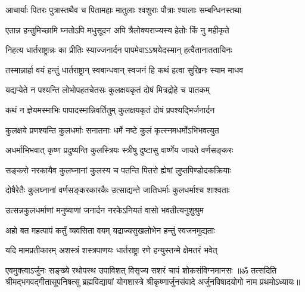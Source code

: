 \twolineshloka
{आचार्याः पितरः पुत्रास्तथैव च पितामहाः}
{मातुलाः श्वशुराः पौत्राः श्यालाः सम्बन्धिनस्तथा}%

\twolineshloka
{एतान्न हन्तुमिच्छामि घ्नतोऽपि मधुसूदन}
{अपि त्रैलोक्यराज्यस्य हेतोः किं नु महीकृते}%

\twolineshloka
{निहत्य धार्तराष्ट्रान्नः का प्रीतिः स्याज्जनार्दन}
{पापमेवाऽऽश्रयेदस्मान् हत्वैतानाततायिनः}%

\twolineshloka
{तस्मान्नार्हा वयं हन्तुं धार्तराष्ट्रान् स्वबान्धवान्}
{स्वजनं हि कथं हत्वा सुखिनः स्याम माधव}%

\twolineshloka
{यद्यप्येते न पश्यन्ति लोभोपहतचेतसः}
{कुलक्षयकृतं दोषं मित्रद्रोहे च पातकम्}%

\twolineshloka
{कथं न ज्ञेयमस्माभिः पापादस्मान्निवर्तितुम्}
{कुलक्षयकृतं दोषं प्रपश्यद्भिर्जनार्दन}%

\twolineshloka
{कुलक्षये प्रणश्यन्ति कुलधर्माः सनातनाः}
{धर्मे नष्टे कुलं कृत्स्नमधर्मोऽभिभवत्युत}%

\twolineshloka
{अधर्माभिभवात् कृष्ण प्रदुष्यन्ति कुलस्त्रियः}
{स्त्रीषु दुष्टासु वार्ष्णेय जायते वर्णसङ्करः}%

\twolineshloka
{सङ्करो नरकायैव कुलघ्नानां कुलस्य च}
{पतन्ति पितरो ह्येषां लुप्तपिण्डोदकक्रियाः}%

\twolineshloka
{दोषैरेतैः कुलघ्नानां वर्णसङ्करकारकैः}
{उत्साद्यन्ते जातिधर्माः कुलधर्माश्च शाश्वताः}%

\twolineshloka
{उत्सन्नकुलधर्माणां मनुष्याणां जनार्दन}
{नरकेऽनियतं वासो भवतीत्यनुशुश्रुम}%

\twolineshloka
{अहो बत महत्पापं कर्तुं व्यवसिता वयम्}
{यद्राज्यसुखलोभेन हन्तुं स्वजनमुद्यताः}%

\twolineshloka
{यदि मामप्रतीकारम् अशस्त्रं शस्त्रपाणयः}
{धार्तराष्ट्रा रणे हन्युस्तन्मे क्षेमतरं भवेत्}%

\twolineshloka
{एवमुक्त्वाऽर्जुनः सङ्ख्ये रथोपस्थ उपाविशत्}
{विसृज्य सशरं चापं शोकसंविग्नमानसः}%
{॥ॐ तत्सदिति श्रीमद्भगवद्गीतासूपनिषत्सु ब्रह्मविद्यायां योगशास्त्रे श्रीकृष्णार्जुनसंवादे अर्जुनविषादयोगो नाम प्रथमोऽध्यायः॥}

